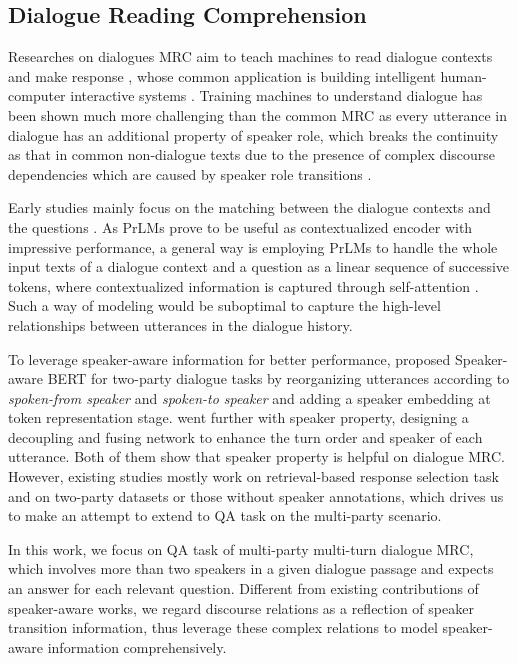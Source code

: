 \documentclass[letterpaper]{article} \usepackage{stylefile}  \usepackage{times}  \usepackage{helvet}  \usepackage{courier}  \usepackage[hyphens]{url}  \usepackage{graphicx} \urlstyle{rm} \def\UrlFont{\rm}  \usepackage{natbib}  \usepackage{caption} \DeclareCaptionStyle{ruled}{labelfont=normalfont,labelsep=colon,strut=off} \frenchspacing  \setlength{\pdfpagewidth}{8.5in}  \setlength{\pdfpageheight}{11in}  \usepackage{algorithm}
\begin{document}
\subsection{Dialogue Reading Comprehension}
Researches on dialogues MRC aim to teach machines to read dialogue contexts and make response \cite{reddy2019coqa,choi2018quac,sun2019dream,mutual}, whose common application is building intelligent human-computer interactive systems \cite{Chen2017survey,Shum2018,AliMe,zhu2018lingke}. Training machines to understand dialogue has been shown much more challenging than the common MRC as every utterance in dialogue has an additional property of speaker role, which breaks the continuity as that in common non-dialogue texts due to the presence of complex discourse dependencies which are caused by speaker role transitions  \cite{afantenos2015discourse,shi2019deep,li2020molweni}.  



Early studies mainly focus on the matching between the dialogue contexts and the questions \cite{huang2018flowqa,zhu2018sdnet}. As PrLMs prove to be useful as contextualized encoder with impressive performance, a general way is employing PrLMs to handle the whole input texts of a dialogue context and a question as a linear sequence of successive tokens, where contextualized information is captured through self-attention \cite{qu2019bert,liu2020hisbert, li2020molweni}. Such a way of modeling would be suboptimal to capture the high-level relationships between utterances in the dialogue history. 

To leverage speaker-aware information for better performance, \citet{Gusabert} proposed Speaker-aware BERT for two-party dialogue tasks by reorganizing utterances according to \emph{spoken-from speaker} and \emph{spoken-to speaker} and adding a speaker embedding at token representation stage. \citet{liumdfn} went further with speaker property, designing a decoupling and fusing network to enhance the turn order and speaker of each utterance. Both of them show that speaker property is helpful on dialogue MRC. However, existing studies mostly work on retrieval-based response selection task and on two-party datasets or those without speaker annotations, which drives us to make an attempt to extend to QA task on the multi-party scenario.

In this work, we focus on QA task of multi-party multi-turn dialogue MRC, which involves more than two speakers in a given dialogue passage \cite{li2020molweni} and expects an answer for each relevant question. Different from existing contributions of speaker-aware works, we regard discourse relations as a reflection of speaker transition information, thus leverage these complex relations to model speaker-aware information comprehensively.
\end{document}
